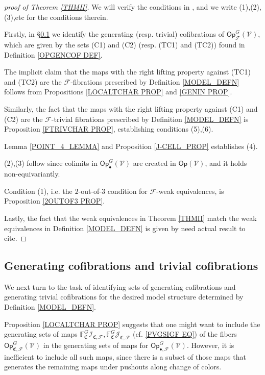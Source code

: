 \documentclass[a4paper,10pt
,draft
]{article}%
\numberwithin{equation}{section}
\numberwithin{figure}{section}
\theoremstyle{definition} %
\newcommand{\Op}{\mathsf{Op}}%
\newcommand{\F}{\ensuremath{\mathcal F}}
\newcommand{\V}{\ensuremath{\mathcal V}}
\newcommand{\1}{\ensuremath{\mathbbm 1}}%
\begin{document}
\begin{proof}[proof of Theorem \ref{THMII}]
We will verify the conditions in 
\cite[Theorem 2.1.19]{Hov}, and we write (1),(2),(3),etc for the conditions therein.

Firstly, in \S \ref{GENCOF SEC} we identify
the generating (resp. trivial) cofibrations of $\mathsf{Op}^G_{\F}(\V)$,
which are given by the sets 
(C1) and (C2) (resp. (TC1) and (TC2))
found in Definition \ref{OPGENCOF DEF}.

The implicit claim that the maps
with the right lifting property against 
(TC1) and (TC2)
are the $\F$-fibrations prescribed by 
Definition \ref{MODEL_DEFN}
follows from Propositions \ref{LOCALTCHAR PROP} and \ref{GENIN PROP}.

Similarly, the fact that the maps
with the right lifting property against 
(C1) and (C2) are the 
$\F$-trivial fibrations prescribed by 
Definition \ref{MODEL_DEFN}
is Proposition \ref{FTRIVCHAR PROP}, 
establishing conditions (5),(6).

Lemma \ref{POINT_4_LEMMA} and Proposition \ref{J-CELL_PROP} establishes (4).

(2),(3) follow since colimits in $\mathsf{Op}^G_\bullet(\V)$ are created in $\Op(\V)$, and it holds non-equivariantly.

Condition (1), i.e. the $2$-out-of-$3$ condition for $\F$-weak equivalences, 
is Proposition \ref{2OUTOF3 PROP}.

Lastly, the fact that the weak equivalences in 
Theorem \ref{THMII}
match the weak equivalences in
Definition \ref{MODEL_DEFN} is given by
{\color{red} need actual result to cite}.
\end{proof}




\subsection{Generating cofibrations and trivial cofibrations}
\label{GENCOF SEC}

We next turn to the task of identifying sets of generating cofibrations and generating trivial cofibrations
for the desired model structure determined by Definition \ref{MODEL_DEFN}.


Proposition \ref{LOCALTCHAR PROP} suggests that one might want to include the generating sets of maps
$\mathbb{F}^G_{\mathfrak{C}} \mathcal{I}_{\mathfrak{C},\mathcal{F}},
\mathbb{F}^G_{\mathfrak{C}} \mathcal{J}_{\mathfrak{C},\mathcal{F}}$
(cf. \eqref{FVGSIGF EQ}) of the fibers 
$\mathsf{Op}^G_{\mathfrak{C},\F}(\V)$
in the generating sets of maps for 
$\mathsf{Op}^G_{\bullet,\F}(\V)$.
However, it is inefficient to include all such maps, 
since there is a subset of those maps
that generates the remaining maps under pushouts along change of colors.
\end{document}
